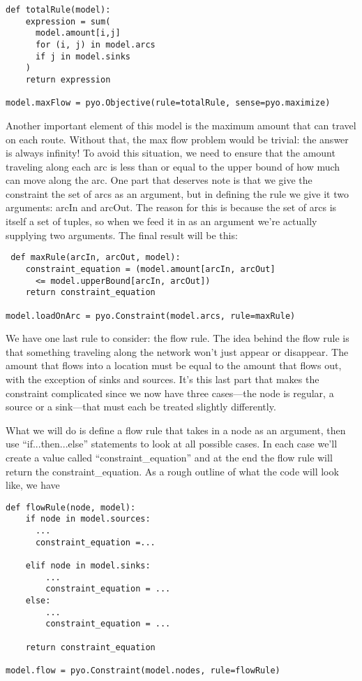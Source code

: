 \documentclass{article}
\begin{document}
\begin{verbatim}
def totalRule(model):
    expression = sum(
      model.amount[i,j]
      for (i, j) in model.arcs
      if j in model.sinks
    )
    return expression

model.maxFlow = pyo.Objective(rule=totalRule, sense=pyo.maximize)
\end{verbatim}

Another important element of this model is the maximum amount that can travel on each route.  Without that, the max flow problem would be trivial: the answer is always infinity!  To avoid this situation, we need to ensure that the amount traveling along each arc is less than or equal to the upper bound of how much can move along the arc.  One part that deserves note is that we give the constraint the set of arcs as an argument, but in defining the rule we give it two arguments: arcIn and arcOut.  The reason for this is because the set of arcs is itself a set of tuples, so when we feed it in as an argument we're actually supplying two arguments.  The final result will be this:

\begin{verbatim}
 def maxRule(arcIn, arcOut, model):
    constraint_equation = (model.amount[arcIn, arcOut] 
      <= model.upperBound[arcIn, arcOut])
    return constraint_equation

model.loadOnArc = pyo.Constraint(model.arcs, rule=maxRule)
\end{verbatim}

We have one last rule to consider: the flow rule.  The idea behind the flow rule is that something traveling along the network won't just appear or disappear.  The amount that flows into a location must be equal to the amount that flows out, with the exception of sinks and sources.  It's this last part that makes the constraint complicated since we now have three cases---the node is regular, a source or a sink---that must each be treated slightly differently.

What we will do is define a flow rule that takes in a node as an argument, then use ``if...then...else'' statements to look at all possible cases.  In each case we'll create a value called ``constraint\_equation'' and at the end the flow rule will return the constraint\_equation.  As a rough outline of what the code will look like, we have

\begin{verbatim}
def flowRule(node, model):
    if node in model.sources:
      ...
      constraint_equation =...
    
    elif node in model.sinks:
        ...
        constraint_equation = ...
    else:
        ...
        constraint_equation = ...
    
    return constraint_equation

model.flow = pyo.Constraint(model.nodes, rule=flowRule)
\end{verbatim}
\end{document}
